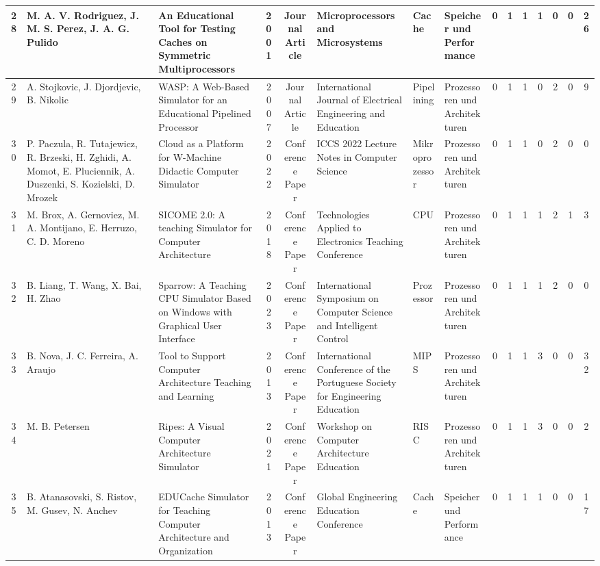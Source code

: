 \begin{landscape}
\begin{longtable}{|c|p{2cm}|p{2cm}|c|c|p{2cm}|p{1cm}|p{1cm}|c|c|c|c|c|c|c|}
    28 & M. A. V. Rodriguez, J. M. S. Perez, J. A. G. Pulido & An Educational Tool for Testing Caches on Symmetric Multiprocessors & 2001 & Journal Article & Microprocessors and Microsystems & Cache & Speicher und Performance & 0 & 1 & 1 & 1 & 0 & 0 & 26 \\ \hline
    29 & A. Stojkovic, J. Djordjevic, B. Nikolic & WASP: A Web-Based Simulator for an Educational Pipelined Processor & 2007 & Journal Article & International Journal of Electrical Engineering and Education & Pipelining & Prozessoren und Architekturen & 0 & 1 & 1 & 0 & 2 & 0 & 9 \\ \hline
    30 & P. Paczula, R. Tutajewicz, R. Brzeski, H. Zghidi, A. Momot, E. Pluciennik, A. Duszenki, S. Kozielski, D. Mrozek & Cloud as a Platform for W-Machine Didactic Computer Simulator & 2022 & Conference Paper & ICCS 2022 Lecture Notes in Computer Science & Mikroprozessor & Prozessoren und Architekturen & 0 & 1 & 1 & 0 & 2 & 0 & 0 \\ \hline
    31 & M. Brox, A. Gernoviez, M. A. Montijano, E. Herruzo, C. D. Moreno & SICOME 2.0: A teaching Simulator for Computer Architecture & 2018 & Conference Paper & Technologies Applied to Electronics Teaching Conference & CPU & Prozessoren und Architekturen & 0 & 1 & 1 & 1 & 2 & 1 & 3 \\ \hline
    32 & B. Liang, T. Wang, X. Bai, H. Zhao & Sparrow: A Teaching CPU Simulator Based on Windows with Graphical User Interface & 2023 & Conference Paper & International Symposium on Computer Science and Intelligent Control & Prozessor & Prozessoren und Architekturen & 0 & 1 & 1 & 1 & 2 & 0 & 0 \\ \hline
    33 & B. Nova, J. C. Ferreira, A. Araujo & Tool to Support Computer Architecture Teaching and Learning & 2013 & Conference Paper & International Conference of the Portuguese Society for Engineering Education & MIPS & Prozessoren und Architekturen & 0 & 1 & 1 & 3 & 0 & 0 & 32 \\ \hline
    34 & M. B. Petersen & Ripes: A Visual Computer Architecture Simulator & 2021 & Conference Paper & Workshop on Computer Architecture Education & RISC & Prozessoren und Architekturen & 0 & 1 & 1 & 3 & 0 & 0 & 2 \\ \hline
    35 & B. Atanasovski, S. Ristov, M. Gusev, N. Anchev & EDUCache Simulator for Teaching Computer Architecture and Organization & 2013 & Conference Paper & Global Engineering Education Conference & Cache & Speicher und Performance & 0 & 1 & 1 & 1 & 0 & 0 & 17 \\ \hline

\end{longtable}
\end{landscape}
